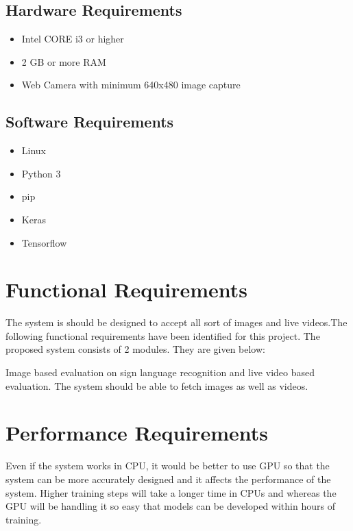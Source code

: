 \subsection{Hardware Requirements}
\begin{itemize}
    \item Intel CORE i3 or higher 
    \item 2 GB or more RAM
    \item Web Camera with minimum 640x480 image capture
\end{itemize}

\subsection{Software Requirements}
\begin{itemize}
    \item Linux
    \item Python 3
    \item pip
    \item Keras
    \item Tensorflow
\end{itemize}

\section{Functional Requirements}
The system is should be designed to accept all sort of images and live videos.The following functional requirements have been
identified for this project. The proposed system consists of 2 modules. They are
given below: 

Image based evaluation on sign language recognition
and live video based evaluation. The system should be able to fetch images as well as videos. 

\section{Performance Requirements}
Even if the system works in CPU, it would be better to use GPU so that the system can be more accurately designed and it affects the performance of the system. Higher training steps will take a longer time in CPUs and whereas the GPU will be handling it so easy that models can be developed within hours of training. 

